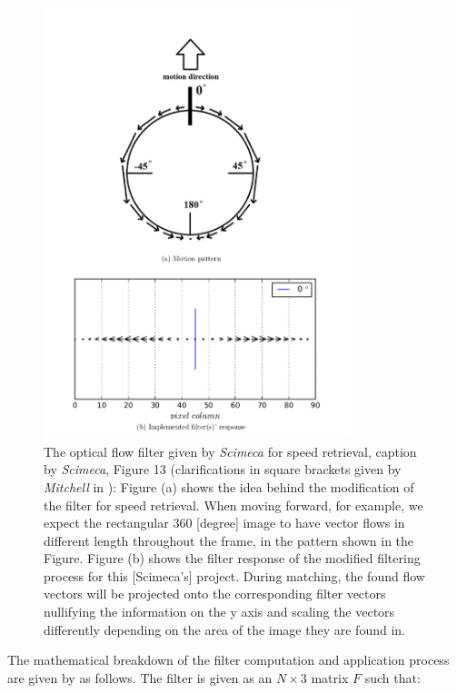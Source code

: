 \documentclass[a4paper,11pt,twoside,openright]{article}
\begin{document}
\begin{figure}
  \centering
  \includegraphics[width=0.8\textwidth]{OFFilter}
  \caption{\label{fig:offilter} The optical flow filter given by
    \textit{Scimeca} for speed retrieval, caption by \textit{Scimeca},
    Figure 13 (clarifications in square brackets given by
    \textit{Mitchell} in \cite{Mitchell2018}): Figure (a) shows the
    idea behind the modiﬁcation of the ﬁlter for speed retrieval. When
    moving forward, for example, we expect the rectangular 360
    [degree] image to have vector ﬂows in diﬀerent length throughout
    the frame, in the pattern shown in the Figure. Figure (b) shows
    the ﬁlter response of the modiﬁed ﬁltering process for this
    [Scimeca’s] project. During matching, the found ﬂow vectors will
    be projected onto the corresponding ﬁlter vectors nullifying the
    information on the y axis and scaling the vectors diﬀerently
    depending on the area of the image they are found in.
  }
\end{figure}

The mathematical breakdown of the filter computation and application
process are given by \cite{Mitchell2018} as follows. The filter is
given as an $N \times 3$ matrix $F$ such that:
\end{document}
